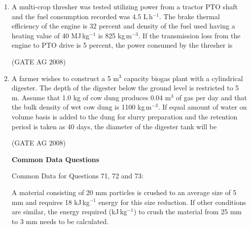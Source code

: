\documentclass[journal,12pt,onecolumn]{IEEEtran}
\begin{document}
\begin{enumerate}
\medskip

\item 
 A multi-crop thresher was tested utilizing power from a tractor PTO shaft and the fuel consumption recorded was 4.5 L\,h$^{-1}$. The brake thermal efficiency of the engine is 32 percent and density of the fuel used having a heating value of 40 MJ\,kg$^{-1}$ is 825 kg\,m$^{-3}$. If the transmission loss from the engine to PTO drive is 5 percent, the power consumed by the thresher is
\begin{enumerate}
\end{enumerate}
\hfill(GATE AG 2008)\\

\medskip

\item 
 A farmer wishes to construct a 5 m$^3$ capacity biogas plant with a cylindrical digester. The depth of the digester below the ground level is restricted to 5 m. Assume that 1.0 kg of cow dung produces 0.04 m$^3$ of gas per day and that the bulk density of wet cow dung is 1100 kg\,m$^{-3}$. If equal amount of water on volume basis is added to the dung for slurry preparation and the retention period is taken as 40 days, the diameter of the digester tank will be
\begin{enumerate}
\end{enumerate}
\hfill(GATE AG 2008)\\

\medskip

\textbf{Common Data Questions}

Common Data for Questions 71, 72 and 73:

A material consisting of 20 mm particles is crushed to an average size of 5 mm and requires 18 kJ\,kg$^{-1}$ energy for this size reduction. If other conditions are similar, the energy required (kJ\,kg$^{-1}$) to crush the material from 25 mm to 3 mm needs to be calculated.


\end{enumerate}
\end{document}
